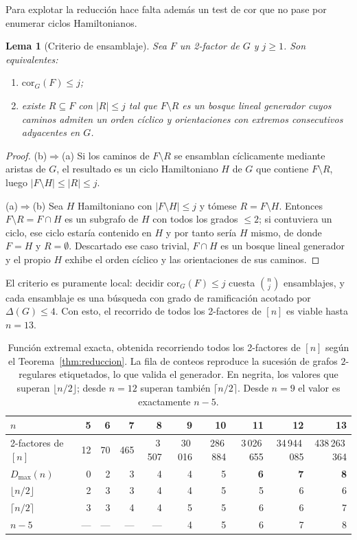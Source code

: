 \documentclass[11pt,a4paper]{article}
\newtheorem{lema}[teorema]{Lema}
\theoremstyle{definition}
\theoremstyle{remark}
\begin{document}
Para explotar la reducción hace falta además un test de $\mathrm{cor}$ que no pase por enumerar ciclos Hamiltonianos.

\begin{lema}[Criterio de ensamblaje]\label{lem:ensamblaje}
Sea $F$ un 2-factor de $G$ y $j\ge1$. Son equivalentes:
\begin{enumerate}[label=(\alph*)]
\item $\mathrm{cor}_G(F)\le j$;
\item existe $R\subseteq F$ con $|R|\le j$ tal que $F\setminus R$ es un bosque lineal generador cuyos caminos admiten un orden cíclico y orientaciones con extremos consecutivos adyacentes en $G$.
\end{enumerate}
\end{lema}

\begin{proof}
(b)$\Rightarrow$(a) Si los caminos de $F\setminus R$ se ensamblan cíclicamente mediante aristas de $G$, el resultado es un ciclo Hamiltoniano $H$ de $G$ que contiene $F\setminus R$, luego $|F\setminus H|\le|R|\le j$.

(a)$\Rightarrow$(b) Sea $H$ Hamiltoniano con $|F\setminus H|\le j$ y tómese $R=F\setminus H$. Entonces $F\setminus R=F\cap H$ es un subgrafo de $H$ con todos los grados $\le2$; si contuviera un ciclo, ese ciclo estaría contenido en $H$ y por tanto sería $H$ mismo, de donde $F=H$ y $R=\emptyset$. Descartado ese caso trivial, $F\cap H$ es un bosque lineal generador y el propio $H$ exhibe el orden cíclico y las orientaciones de sus caminos.
\end{proof}

El criterio es puramente local: decidir $\mathrm{cor}_G(F)\le j$ cuesta $\binom{n}{j}$ ensamblajes, y cada ensamblaje es una búsqueda con grado de ramificación acotado por $\Delta(G)\le4$. Con esto, el recorrido de todos los 2-factores de $[n]$ es viable hasta $n=13$.

\begin{table}[h]
\centering\small
\setlength{\tabcolsep}{4.5pt}
\begin{tabular}{lrrrrrrrrr}
\toprule
$n$ & 5 & 6 & 7 & 8 & 9 & 10 & 11 & 12 & 13\\
\midrule
2-factores de $[n]$ & 12 & 70 & 465 & 3\,507 & 30\,016 & 286\,884 & 3\,026\,655 & 34\,944\,085 & 438\,263\,364\\
$D_{\max}(n)$ & 0 & 2 & 3 & 4 & 4 & 5 & \textbf{6} & \textbf{7} & \textbf{8}\\
$\lfloor n/2\rfloor$ & 2 & 3 & 3 & 4 & 4 & 5 & 5 & 6 & 6\\
$\lceil n/2\rceil$ & 3 & 3 & 4 & 4 & 5 & 5 & 6 & 6 & 7\\
$n-5$ & --- & --- & --- & --- & 4 & 5 & 6 & 7 & 8\\
\bottomrule
\end{tabular}
\caption{Función extremal exacta, obtenida recorriendo todos los 2-factores de $[n]$ según el Teorema~\ref{thm:reduccion}. La fila de conteos reproduce la sucesión de grafos $2$-regulares etiquetados, lo que valida el generador. En negrita, los valores que superan $\lfloor n/2\rfloor$; desde $n=12$ superan también $\lceil n/2\rceil$. Desde $n=9$ el valor es exactamente $n-5$.}\label{tab:Dmax}
\end{table}
\end{document}

